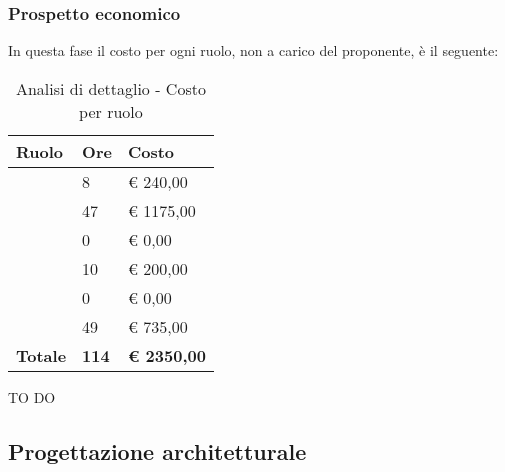 		\subsubsection{Prospetto economico} %
		\label{ssub:prospetto_economico}
		In questa fase il costo per ogni ruolo, non a carico del proponente, è il seguente: \\
			\begin{table}[!h]
				\begin{center}
					\begin{tabularx}{0.65\textwidth}{|l|l|X|}
						\hline
						\textbf{Ruolo} & \textbf{Ore} & \textbf{Costo} \\
						\hline
						\roleProjectManager & 8 & \euro{} 240,00 \\
						\hline
						\roleAnalyst & 47 & \euro{} 1175,00 \\
						\hline
						\roleDesigner & 0 & \euro{} 0,00 \\
						\hline
						\roleAdministrator & 10 & \euro{} 200,00 \\
						\hline
						\roleProgrammer & 0 & \euro{} 0,00 \\
						\hline
						\roleVerifier & 49 & \euro{} 735,00 \\
						\hline
						\textbf{Totale} & \textbf{114} & \textbf{\euro{} 2350,00} \\
						\hline
					\end{tabularx}
				\end{center}
			\caption{Analisi di dettaglio - Costo per ruolo}
			\end{table}

		\noindent
		TO DO
		
	
	\subsection{Progettazione architetturale} %
	\label{sub:progettazione_architetturale}
